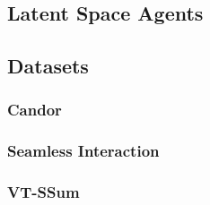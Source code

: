 \documentclass[12pt, a4paper]{article}
\begin{document}
\subsection{Latent Space Agents}



\subsection{Datasets}


\subsubsection{Candor}


\subsubsection{Seamless Interaction}


\subsubsection{VT-SSum}

\end{document}
